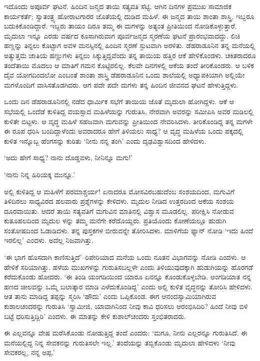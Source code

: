 ಇದೊಂದು ಅಪೂರ್ವ ಘಟನೆ. ಹಿಂದಿನ ಜನ್ಮದ ತಾಯಿ ಸತ್ಯವತಿ ಸೆಟ್ಟಿ. ಆಗಿನ ದಿನಗಳ ಪ್ರಮುಖ ಸಾಮಾಜಿಕ ಕಾರ್ಯಕರ್ತೆ; ಸ್ವಾತಂತ್ರ್ಯ ಹೋರಾಟಗಾರರ ಜೊತೆಯಲ್ಲಿ ದುಡಿದ ಮಹಿಳೆ. ಈ ಜನ್ಮದ ತಾಯಿ ಶಾಂತಾ ಶಾಸ್ತ್ರಿ. ಇಬ್ಬರೂ ಬದುಕಿಕೊಂಡಿದ್ದಾರೆ. ಇಬ್ಬರು ತಾಯಂ ದಿರೂ ತಮ್ಮ ಈ ಮಗಳನ್ನು ಅತ್ಯಂತ ಪ್ರೀತಿಯಿಂದ ನೋಡಿಕೊಳ್ಳುತ್ತಾರೆ. ಮೃದುಲಾ ಇನ್ನೂ ಎರಡು ವರ್ಷದ ಕೂಸಾಗಿರುವಾಗ ಪೂರ್ವಜನ್ಮದ ಸ್ಮರಣೆಯ ಘಟನೆ ಪ್ರಾರಂಭವಾದದ್ದು. ಲಿಚಿ ಹಣ್ಣನ್ನು ತಿನ್ನಲು ಕೊಟ್ಟಾಗ ಅವಳ ಮನಸ್ಸಿನಲ್ಲಿ ಹಿಂದಿನ ಸ್ಮರಣೆ ಸ್ಫುಟವಾಗಿ ಅರಳಿತು. ಡೆಹರಾಡೂನಿನ ತನ್ನ ಮನೆಯಲ್ಲಿ ಅತ್ಯುತ್ತಮ ಜಾತಿಯ ಹಣ್ಣುಗಳು ತಿನ್ನಲು ಸಿಕ್ಕುತ್ತಿದ್ದವೆಂದು ತನ್ನ ತಾಯಿಯ ಹತ್ತಿರ ಆಕೆ ಹೇಳಿಕೊಂಡಳು. ಚಕಿತರಾದರೂ ತಂದೆತಾಯಿ ಮೊದಲು ಆ ಮಾತಿಗೆ ಗಮನ ಕೊಟ್ಟಿರಲಿಲ್ಲ. ಕೆಲವೇ ದಿನಗಳಲ್ಲಿ ಆಕೆಯ ತಂದೆ ತೀರಿಕೊಂಡರು. ಆ ಬಳಿಕ ದೈವ ಯೋಗದಿಂದಲೋ ಎಂಬಂತೆ ಶಾಂತಾ ಶಾಸ್ತ್ರಿ ಡೆಹರಾಡೂನಿನ ಒಂದು ಶಾಲೆಯಲ್ಲಿ ಅಧ್ಯಾಪಕಿಯಾಗಿ ಅಲ್ಲಿಯೇ ಮಗಳೊಂದಿಗೆ ವಾಸಿಸತೊಡಗಿದರು. ಆಗ ಪದೇ ಪದೇ ಮಗಳು ತನ್ನ ಹಿಂದಿನ ಜೀವನದ ಘಟನೆ ಹೇಳುತ್ತಿದ್ದಳು.

ಒಂದು ದಿನ ಡೆಹರಾಡೂನಿನಲ್ಲಿ ನಡೆದ ಧಾರ್ಮಿಕ ಸಭೆಗೆ ತಾಯಿಯ ಜೊತೆ ಮೃದುಲಾ ಹೋಗಿದ್ದಳು. ಆಕೆ ಆ ಸಭೆಯಲ್ಲಿ ಒಂದೆಡೆ ಕುಳಿತಿದ್ದ ವಯಸ್ಸಾದ ಮಹಿಳೆಯನ್ನು ಗುರುತಿಸಿ, ನೇರವಾಗಿ ಅವರನ್ನು ಸಮೀಪಿಸಿ ಅವರ ಮಡಿಲಲ್ಲಿ ಕುಳಿತೇ ಬಿಟ್ಟಳು. ಆ ವೃದ್ಧ ಮಹಿಳೆ ಸಹಜವಾಗಿ ಮಗುವನ್ನು ಪ್ರೀತಿಯಿಂದ ನೇವರಿಸಿದಳು. ತೀರಿಕೊಂಡಿದ್ದ ತನ್ನ ಮಗಳೇ ಈ ರೂಪ ಧರಿಸಿ ಬಂದಿದ್ದಾಳೆಂದು ಅವರಾದರೂ ಹೇಗೆ ತಿಳಿಯಲು ಸಾಧ್ಯ? ಆ ವೃದ್ಧ ಮಹಿಳೆಯ ಒಂದು ಪಕ್ಕದಲ್ಲಿ ಕುಳಿತ ಇನ್ನೊಬ್ಬ ಹೆಂಗಸನ್ನು ಕುರಿತು ‘ನೀನು ನನ್ನ ತಂಗಿ’ ಎಂದು ದೃಢವಿಶ್ವಾಸದಿಂದ ಹೇಳಿದಳು.

‘ಅದು ಹೇಗೆ ಸಾಧ್ಯ? ನಾನು ದೊಡ್ಡವಳು, ನೀನಿನ್ನೂ ಮಗು!’

‘ನಾನು ನಿನ್ನ ಹಿರಿಯಕ್ಕ ಮುನ್ನೂ.’

ಅಲ್ಲಿ ಕುಳಿತಿದ್ದ ಆ ಮಹಿಳೆಗೆ ಪರಮಾಶ್ಚರ್ಯ! ಏನಾದರೂ ಮೋಸವಿರಬಹುದೆಂಬ ಸಂಶಯದಿಂದ, ಮಗುವಿಗೆ ತಿಳಿದಿರಲು ಸಾಧ್ಯವಿರದ ಹಲವಾರು ಪ್ರಶ್ನೆಗಳನ್ನು ಕೇಳಿದಳು. ಮೃದುಲ ನೀಡಿದ ಉತ್ತರದಿಂದ ಆಕೆಯ ಸಂಶಯ ದೂರವಾಯಿತು. ಆದರೆ ತಾಯಿ ಸತ್ಯವತಿಗೆ ಮಗುವಿನ ಮಾತಿನಲ್ಲಿ ವಿಶ್ವಾಸ ಮೂಡಲಿಲ್ಲ. ಪರೀಕ್ಷಿಸಿ ನೋಡುವ ಕುತೂಹಲದಿಂದ ಮೃದುಲ ಳನ್ನು ತಮ್ಮ ಮನೆಗೇ ಕರೆದೊಯ್ದರು. ಪ್ರತಿಯೊಂದು ಕೋಣೆಯಲ್ಲೂ ಹುಡುಗಿ ಸಂತೋಷದಿಂದ ಓಡಾಡಿದಳು. ತನ್ನ ಪುಸ್ತಕಗಳ ಬೀರುವನ್ನೇ ತೋರಿಸಿದಳು. ಮಾಳಿಗೆಯ ಫ್ಯಾನ್ ನೋಡಿ ‘ಇದು ಹಿಂದೆ ಇರಲಿಲ್ಲ’ ಎಂದಳು. ಅದೆಲ್ಲ ನಿಜವಾಗಿತ್ತು.

‘ಈ ಭಾಗ ಹೊಸದಾಗಿ ಕಾಣಿಸುತ್ತಿದೆ’–ರಿಪೇರಿಯಾದ ಮನೆಯ ಒಂದು ನೂತನ ವಿಭಾಗವನ್ನು ನೋಡಿ ಎಂದಳು. ಆ ಹೇಳಿಕೆ ಸರಿಯಾಗಿತ್ತು. ಹಳೆಯ ಮುಖಗಳನ್ನು ಗುರುತಿಸಬಲ್ಲಳೇ ಎಂದು ತಿಳಿಯುವುದಕ್ಕಾಗಿ ಹುಡುಗಿಯನ್ನು ಹೊರಗಡೆ ಕರೆದುಕೊಂಡು ಹೋದರು. ‘ಈ ತಿಂಡಿ ಯಂಗಡಿಯಿಂದ ಯಾರೂ ಏನನ್ನೂ ಕೊಂಡುಕೊಳ್ಳಬೇಡಿ. ಅಂಗಡಿಯಾತ ನನ್ನ ಹಣದ ಚೀಲವನ್ನು ಒಮ್ಮೆ ಬಲಾತ್ಕಾರ ಮಾಡಿ ಎಳೆದುಕೊಂಡಿದ್ದ’ ಎಂದು ಅಲ್ಲಿ ಕುಳಿತ ವೃದ್ಧನನ್ನು ತೋರಿಸಿ ಹೇಳಿದಳು. ಆತ ತಾನು ಮಾಡಿದ್ದ ತಪ್ಪನ್ನು ಸ್ಮರಿಸಿ ‘ಹೌದು’ ಎಂದು ಒಪ್ಪಿಕೊಂಡ. ಈಗ ಆನಂದಸ್ವಾಮಿಯಾಗಿರುವ ಕುಶಾಲಚಂದರನ್ನು ಗುರುತಿಸಿ ‘ಸ್ವಾಮೀಜಿ, ಯಾವಾಗಿನಿಂದ ನೀವು ಕಾವಿ ಧರಿಸಲು ಆರಂಭಿಸಿದಿರಿ? ಹಿಂದೆ ನೀವು ಬಿಳಿ ಬಟ್ಟೆ ಧರಿಸುತ್ತಿದ್ದಿರಿ’ ಎಂದಳು. ಈ ಮಾತನ್ನು ಕೇಳಿ ಕುಶಾಲ್​ಚಂದರು ಸ್ತಂಭಿತರಾದರು.

ಈ ಎಲ್ಲವನ್ನೂ ವೇಷ ಮರೆಸಿಕೊಂಡು ನೋಡುತ್ತಿದ್ದ ತಂದೆ ಎಂದರು: ‘ಮಗೂ, ನೀನು ಎಲ್ಲರನ್ನೂ ಗುರುತಿಸಿದೆ. ಈ ಮನೆಯಲ್ಲಿದ್ದ ನಿನ್ನ ಸೇವಕನನ್ನು ಗುರುತಿಸಲೇ ಇಲ್ಲ.’ ತಂದೆಯನ್ನು ತಬ್ಬಿಕೊಂಡು ಮೃದುಲಾ ಹೇಳಿದಳು ‘ನೀವು ಸೇವಕರಲ್ಲ, ನನ್ನ ಅಪ್ಪ.’

